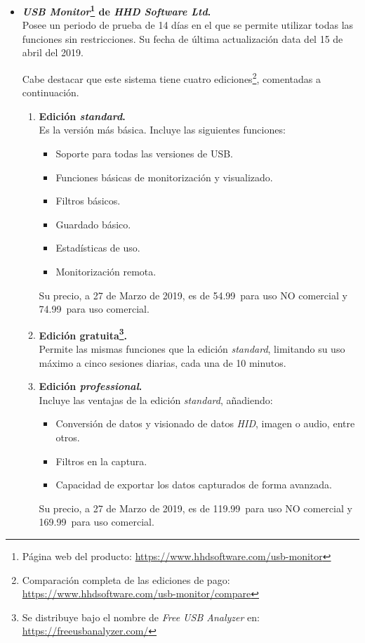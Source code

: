 \begin{itemize}
    \item \textbf{\emph{USB Monitor}\footnote{Página web del producto: \url{https://www.hhdsoftware.com/usb-monitor}} de \emph{HHD Software Ltd}.} \\
    Posee un periodo de prueba de 14 días en el que se permite utilizar todas las funciones sin restricciones. Su fecha de última actualización data del 15 de abril del 2019.

    Cabe destacar que este sistema tiene cuatro ediciones\footnote{Comparación completa de las ediciones de pago: \url{https://www.hhdsoftware.com/usb-monitor/compare}}, comentadas a continuación.
    \begin{enumerate}
        \item \textbf{Edición \emph{standard}.} \\ 
        Es la versión más básica. Incluye las siguientes funciones:
        \begin{itemize}
            \item Soporte para todas las versiones de USB.
            \item Funciones básicas de monitorización y visualizado.
            \item Filtros básicos.
            \item Guardado básico.
            \item Estadísticas de uso.
            \item Monitorización remota.
        \end{itemize}
        Su precio, a 27 de Marzo de 2019, es de 54.99\texteuro ~para uso NO comercial y 74.99\texteuro ~para uso comercial.

        \item \textbf{Edición gratuita\footnote{Se distribuye bajo el nombre de \emph{Free USB Analyzer} en: \url{https://freeusbanalyzer.com/}}.} \\
        Permite las mismas funciones que la edición \emph{standard}, limitando su uso máximo a cinco sesiones diarias, cada una de 10 minutos.
        
        \item \textbf{Edición \emph{professional}.} \\
        Incluye las ventajas de la edición \emph{standard}, añadiendo:
        \begin{itemize}
            \item Conversión de datos y visionado de datos \emph{HID}, imagen o audio, entre otros.
            \item Filtros en la captura.
            \item Capacidad de exportar los datos capturados de forma avanzada.
        \end{itemize}
        Su precio, a 27 de Marzo de 2019, es de 119.99\texteuro ~para uso NO comercial y 169.99\texteuro ~para uso comercial.
        

\end{enumerate}
\end{itemize}
